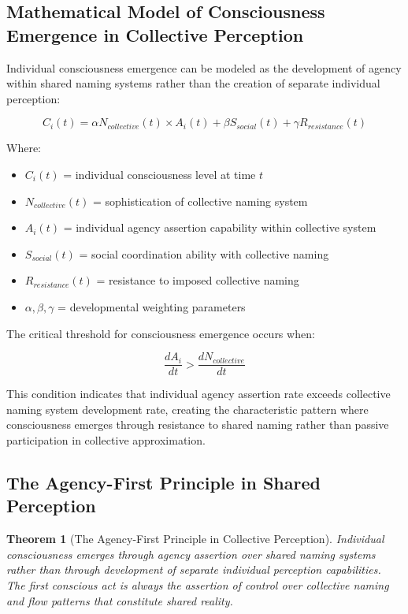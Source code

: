 \documentclass[12pt]{article}
\newtheorem{theorem}{Theorem}
\begin{document}
\subsection{Mathematical Model of Consciousness Emergence in Collective Perception}

Individual consciousness emergence can be modeled as the development of agency within shared naming systems rather than the creation of separate individual perception:

$$C_i(t) = \alpha N_{collective}(t) \times A_i(t) + \beta S_{social}(t) + \gamma R_{resistance}(t)$$

Where:
\begin{itemize}
\item $C_i(t)$ = individual consciousness level at time $t$
\item $N_{collective}(t)$ = sophistication of collective naming system
\item $A_i(t)$ = individual agency assertion capability within collective system
\item $S_{social}(t)$ = social coordination ability with collective naming
\item $R_{resistance}(t)$ = resistance to imposed collective naming
\item $\alpha, \beta, \gamma$ = developmental weighting parameters
\end{itemize}

The critical threshold for consciousness emergence occurs when:

$$\frac{dA_i}{dt} > \frac{dN_{collective}}{dt}$$

This condition indicates that individual agency assertion rate exceeds collective naming system development rate, creating the characteristic pattern where consciousness emerges through resistance to shared naming rather than passive participation in collective approximation.

\subsection{The Agency-First Principle in Shared Perception}

\begin{theorem}[The Agency-First Principle in Collective Perception]
Individual consciousness emerges through agency assertion over shared naming systems rather than through development of separate individual perception capabilities. The first conscious act is always the assertion of control over collective naming and flow patterns that constitute shared reality.
\end{theorem}
\end{document}
